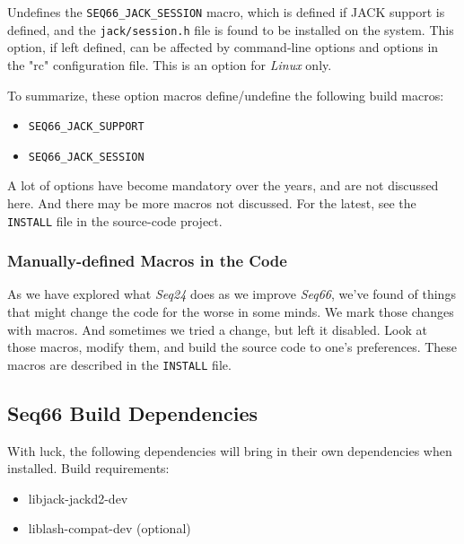         Undefines the \texttt{SEQ66\_JACK\_SESSION} macro, which is
        defined if JACK support is defined, and the
        \texttt{jack/session.h} file is found to be installed on the system.
        This option, if left defined, can be affected by
        command-line options and options in the "rc" configuration file.
        This is an option for \textsl{Linux} only.

    To summarize, these option macros define/undefine the following build
    macros:

      \begin{itemize}
        \item \texttt{SEQ66\_JACK\_SUPPORT}
        \item \texttt{SEQ66\_JACK\_SESSION}
      \end{itemize}

   A lot of options have become mandatory over the years, and are not discussed
   here.  And there may be more macros not discussed.  For the latest, see the
   \texttt{INSTALL} file in the source-code project.

\subsubsection{Manually-defined Macros in the Code}
\label{subsubsec:build_macros}

   As we have explored what \textsl{Seq24} does as we improve
   \textsl{Seq66}, we've found of things that might change the code
   for the worse in some minds.
   We mark those changes with macros.
   And sometimes we tried a change, but left it disabled.
   Look at those macros, modify them, and build
   the source code to one's preferences.
   These macros are described in the \texttt{INSTALL} file.

\subsection{Seq66 Build Dependencies}
\label{subsec:build_dependencies}

   With luck, the following dependencies will bring in their own
   dependencies when installed.  Build requirements:

     \begin{itemize}
        \item libjack-jackd2-dev
        \item liblash-compat-dev (optional)
     \end{itemize}

